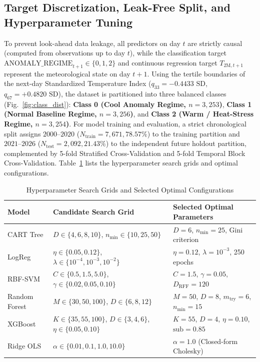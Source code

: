 \documentclass[conference]{IEEEtran}
\begin{document}
\subsection{Target Discretization, Leak-Free Split, and Hyperparameter Tuning}
To prevent look-ahead data leakage, all predictors on day $t$ are strictly causal (computed from observations up to day $t$), while the classification target $\text{ANOMALY\_REGIME}_{t+1} \in \{0, 1, 2\}$ and continuous regression target $T_{\text{2M}, t+1}$ represent the meteorological state on day $t+1$. Using the tertile boundaries of the next-day Standardized Temperature Index ($q_{33} = -0.4433\text{ SD}$, $q_{67} = +0.4820\text{ SD}$), the dataset is partitioned into three balanced classes (Fig.~\ref{fig:class_dist}): \textbf{Class 0 (Cool Anomaly Regime, $n=3,253$)}, \textbf{Class 1 (Normal Baseline Regime, $n=3,256$)}, and \textbf{Class 2 (Warm / Heat-Stress Regime, $n=3,254$)}. For model training and evaluation, a strict chronological split assigns $2000\text{--}2020$ ($N_{\text{train}} = 7,671, 78.57\%$) to the training partition and $2021\text{--}2026$ ($N_{\text{test}} = 2,092, 21.43\%$) to the independent future holdout partition, complemented by 5-fold Stratified Cross-Validation and 5-fold Temporal Block Cross-Validation. Table~\ref{tab:hyperparams} lists the hyperparameter search grids and optimal configurations.

\begin{table}[!t]
\centering
\caption{Hyperparameter Search Grids and Selected Optimal Configurations}
\label{tab:hyperparams}
\footnotesize
\setlength{\tabcolsep}{3.5pt}
\renewcommand{\arraystretch}{1.15}
\begin{tabularx}{\columnwidth}{l p{2.7cm} X}
\toprule
\textbf{Model} & \textbf{Candidate Search Grid} & \textbf{Selected Optimal Parameters} \\
\midrule
CART Tree & $D \in \{4,6,8,10\}$, $n_{\min} \in \{10,25,50\}$ & $D=6$, $n_{\min}=25$, Gini criterion \\
LogReg & $\eta \in \{0.05,0.12\}$, $\lambda \in \{10^{-4},10^{-3},10^{-2}\}$ & $\eta=0.12$, $\lambda=10^{-3}$, 250 epochs \\
RBF-SVM & $C \in \{0.5,1.5,5.0\}$, $\gamma \in \{0.02,0.05,0.10\}$ & $C=1.5$, $\gamma=0.05$, $D_{\text{RFF}}=120$ \\
Random Forest & $M \in \{30,50,100\}$, $D \in \{6,8,12\}$ & $M=50$, $D=8$, $m_{\text{try}}=6$, $n_{\min}=15$ \\
XGBoost & $K \in \{35,55,100\}$, $D \in \{3,4,6\}$, $\eta \in \{0.05,0.10\}$ & $K=55$, $D=4$, $\eta=0.10$, $\text{sub}=0.85$ \\
Ridge OLS & $\alpha \in \{0.01, 0.1, 1.0, 10.0\}$ & $\alpha = 1.0$ (Closed-form Cholesky) \\
\bottomrule
\end{tabularx}
\end{table}
\end{document}
